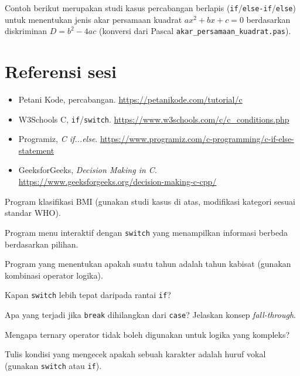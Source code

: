 \documentclass[../main.tex]{subfiles}
\begin{document}
Contoh berikut merupakan studi kasus percabangan berlapis (\texttt{if}/\texttt{else-if}/\texttt{else}) untuk menentukan jenis akar persamaan kuadrat $ax^2+bx+c=0$ berdasarkan diskriminan $D = b^2 - 4ac$ (konversi dari Pascal \texttt{akar\_persamaan\_kuadrat.pas}).



\section{Referensi sesi}
\begin{itemize}[leftmargin=*]
  \item Petani Kode, percabangan. \url{https://petanikode.com/tutorial/c}
  \item W3Schools C, \texttt{if}/\texttt{switch}. \url{https://www.w3schools.com/c/c_conditions.php}
  \item Programiz, \textit{C if...else}. \url{https://www.programiz.com/c-programming/c-if-else-statement}
  \item GeeksforGeeks, \textit{Decision Making in C}. \url{https://www.geeksforgeeks.org/decision-making-c-cpp/}
\end{itemize}

\begin{aktivitas}
  \item Program klasifikasi BMI (gunakan studi kasus di atas, modifikasi kategori sesuai standar WHO).
  \item Program menu interaktif dengan \texttt{switch} yang menampilkan informasi berbeda berdasarkan pilihan.
  \item Program yang menentukan apakah suatu tahun adalah tahun kabisat (gunakan kombinasi operator logika).
\end{aktivitas}

\begin{latihan}
  \item Kapan \texttt{switch} lebih tepat daripada rantai \texttt{if}?
  \item Apa yang terjadi jika \texttt{break} dihilangkan dari \texttt{case}? Jelaskan konsep \textit{fall-through}.
  \item Mengapa ternary operator tidak boleh digunakan untuk logika yang kompleks?
  \item Tulis kondisi yang mengecek apakah sebuah karakter adalah huruf vokal (gunakan \texttt{switch} atau \texttt{if}).
\end{latihan}
\end{document}
